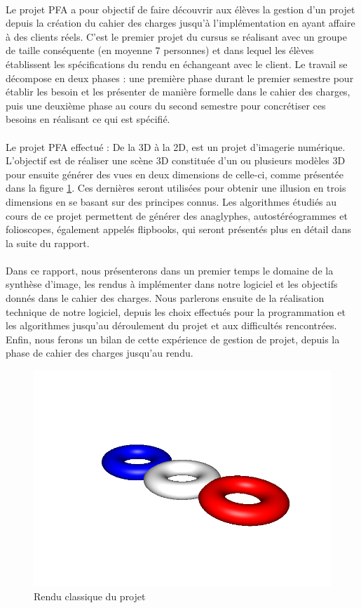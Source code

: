 \paragraph{}
        Le projet PFA a pour objectif de faire découvrir aux élèves la gestion d'un projet depuis la création du cahier des charges jusqu'à l'implémentation en ayant affaire à des clients réels. C'est le premier projet du cursus se réalisant avec un groupe de taille conséquente (en moyenne 7 personnes) et dans lequel les élèves établissent les spécifications du rendu en échangeant avec le client. Le travail se décompose en deux phases : une première phase durant le premier semestre pour établir les besoin et les présenter de manière formelle dans le cahier des charges, puis une deuxième phase au cours du second semestre pour concrétiser ces besoins en réalisant ce qui est spécifié.

\paragraph{}      
        Le projet PFA effectué : De la 3D à la 2D, est un projet d'imagerie numérique. L'objectif est de réaliser une scène 3D constituée d'un ou plusieurs modèles 3D pour ensuite générer des vues en deux dimensions de celle-ci, comme présentée dans la figure \ref{fig:3Don}. Ces dernières seront utilisées pour obtenir une illusion en trois dimensions en se basant sur des principes connus. Les algorithmes étudiés au cours de ce projet permettent de générer des anaglyphes, autostéréogrammes et folioscopes, également appelés flipbooks,  qui seront présentés plus en détail dans la suite du rapport.
        
\paragraph{}
        Dans ce rapport, nous présenterons dans un premier temps le domaine de la synthèse d'image, les rendus à implémenter dans notre logiciel et les objectifs donnés dans le cahier des charges. Nous parlerons ensuite de la réalisation technique de notre logiciel, depuis les choix effectués pour la programmation et les algorithmes jusqu'au déroulement du projet et aux difficultés rencontrées. Enfin, nous ferons un bilan de cette expérience de gestion de projet, depuis la phase de cahier des charges jusqu'au rendu.

\begin{figure}[h]
	\centering
	\includegraphics[scale=0.4]{3donut_rendu.png}
	\caption{\label{fig:3Don} Rendu classique du projet \protect}
\end{figure}
